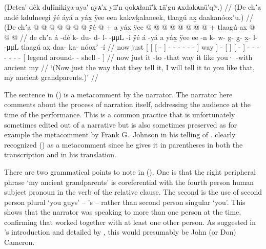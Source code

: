 \ex\label{ex:92-107-tell-it-how-they-told-it}%
%
\begingl
	\glpreamble	(Detca′ dêk dułînikiỵa-aya′ ayᴀ′x ỵīī′n qokᴀłanī′k ʟā′gu ᴀxdakᴀnū′q!ᵘ.) //
	\glpreamble	(De chʼa aadé kdulneegi ÿé áyá a yáx̱ ÿee een kakwḵalaneek, tlaagú ax̱ daakanóoxʼu.) //
	\gla	(De chʼa 
		{} {} {}  @ {} {}
			 @ {} @ {} @ {} @ {} @ {} @ {} {} ÿé {}
		 @ {} +
		{} a yáx̱ {}
		{} ÿee  @ {} {}
		 @ {} @ {} @ {} @ {} @ {} @ {} @ {} +
		{} tlaagú ax̱  @ {} @ {} @ {} {} //
	\glb	\phantom{(}de chʼa
		{} {} {} á -dé {} k- du- d- l-  -μμL -i {} ÿé {}
		á -yá
		{} a yáx̱ {}
		{} ÿee ee -n {}
		k- w- g- g̱- x̱- l-  -μμL
		{} tlaagú ax̱ daa- ka- nóoxʼ -í {}\rlap{\phantom{)}} //
	\glc	\phantom{(}now just
		{}[ {}[ {}[  - {}]
			- - - - 
				 - - {}] way {}]
		 -
		{}[   {}]
		{}[   - {}]
		- - - - - -
			 -
		{}[ legend  around- - shell - 
		{}]\rlap{\phantom{)}} //
	\gld	\phantom{(}now just {} {} {} it -to {}
			 {} {} {} {} {} -that {}
			way {}
		 {}
		{} it like {}
		{} you· {} -with {}
		 {} {} {} {} {} {} {}
		{} ancient my  {} {} {} {} //
	\glft	‘(Now just the way that they tell it, I will tell it to you like that, my ancient grandparents.)’
		//
\endgl
\xe

The sentence in (\lastx) is a metacomment by the narrator.
The narrator here comments about the process of narration itself, addressing the audience at the time of the performance.
This is a common practice that is unfortunately sometimes edited out of a narrative but is also sometimes preserved as for example the metacomment by  Frank G.\ Johnson in his telling of  \parencite[140.24]{dauenhauer:1987}.
\citeauthor{swanton:1909} clearly recognized (\lastx) as a metacomment since he gives it in parentheses in both the transcription and in his translation.

There are two grammatical points to note in (\lastx).
One is that the right peripheral phrase  ‘my ancient grandparents’ is coreferential with the fourth person human subject pronoun  in the verb  of the relative clause.
The second is the use of second person plural  ‘you guys’ – \citeauthor{swanton:1909}’s  – rather than second person singular  ‘you’.
This shows that the narrator was speaking to more than one person at the time, confirming that \citeauthor{swanton:1909} worked together with at least one other person.
As suggested in \citeauthor{swanton:1909}’s introduction and detailed by \textcite{jones:2017}, this would presumably be  John (or Don) Cameron.

